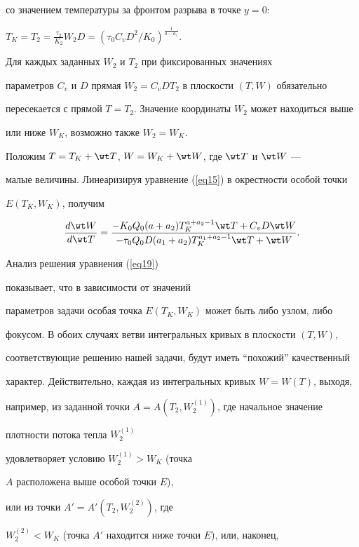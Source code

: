 со значением температуры за фронтом разрыва в точке $y=0$:


$T_K=T_2=\frac{\tau_2}{K_2}W_2D=(\tau_0C_vD^2/K_0)^


{\frac{1}{a-a_1}}$.


Для каждых заданных $W_2$ и $T_2$ при фиксированных значениях


параметров $C_v$ и $D$ прямая $W_2=C_vDT_2$ в плоскости $(T,W)$ обязательно


пересекается с прямой $T=T_2$. Значение координаты $W_2$ может находиться выше


или ниже $W_K$, возможно также $W_2=W_K$.





Положим $T=T_K+\wt T$, $W=W_K+\wt W$, где $\wt T$ и $\wt W$ ---


малые величины. Линеаризируя уравнение (\ref{eq15}) в окрестности особой точки


$E(T_K,W_K)$, получим


\begin{equation}\label{eq19}


\frac{d\wt W}{d\wt T}=\frac


{-K_0Q_0(a+a_2)T^{a+a_2-1}_K\wt T+C_vD\wt W}


{-\tau_0Q_0D(a_1+a_2)T_K^{a_1+a_2-1}\wt T+\wt W}.


\end{equation}


Анализ решения уравнения (\ref{eq19}) 


показывает, что в зависимости от значений


параметров задачи особая точка $E(T_K,W_K)$ может быть либо узлом, либо


фокусом. В обоих случаях ветви интегральных кривых в плоскости $(T,W)$,


соответствующие решению нашей задачи, будут иметь ``похожий'' качественный


характер. Действительно, каждая из интегральных кривых $W=W(T)$, выходя,


например, из заданной точки $A=A(T_2,W_2^{(1)})$, где начальное значение


плотности потока тепла $W_2^{(1)}$ 


удовлетворяет условию $W_2^{(1)}>W_K$ (точка


$A$ расположена выше особой точки $E$), 


или из точки $A'=A'(T_2,W_2^{(2)})$, где


$W_2^{(2)}<W_K$ (точка $A'$ находится ниже точки $E$), или, наконец, 


